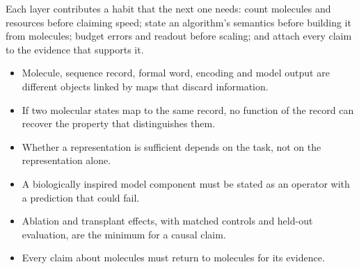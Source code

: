 Each layer contributes a habit that the next one needs: count molecules and
resources before claiming speed; state an algorithm's semantics before building
it from molecules; budget errors and readout before scaling; and attach every
claim to the evidence that supports it.

\begin{KeyIdeas}
\begin{itemize}\setlength{\itemsep}{2pt}
\item Molecule, sequence record, formal word, encoding and model output are
different objects linked by maps that discard information.
\item If two molecular states map to the same record, no function of the record
can recover the property that distinguishes them.
\item Whether a representation is sufficient depends on the task, not on the
representation alone.
\item A biologically inspired model component must be stated as an operator with
a prediction that could fail.
\item Ablation and transplant effects, with matched controls and held-out
evaluation, are the minimum for a causal claim.
\item Every claim about molecules must return to molecules for its evidence.
\end{itemize}
\end{KeyIdeas}


